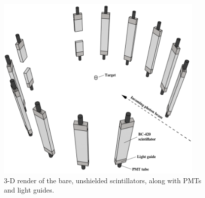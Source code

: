\begin{figure}[]
    \centering
    \includegraphics[width = 0.9\textwidth]{Content/Methods/Detectors.png}
    \caption{3-D render of the bare, unshielded scintillators, along with PMTs and light guides.}
    \label{fig:DetGeom}
\end{figure}

